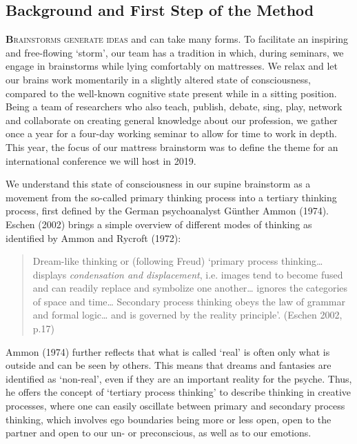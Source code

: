     \begin{adjmulticols}{2}{0mm}{0mm}
\chapter{Background and First Step of the Method}%
\lettrine[lines=2]{\bfseries\color{black}B}{rainstorms generate ideas} and can take many forms. To facilitate an inspiring and free-flowing ‘storm’, our team has a tradition in which, during seminars, we engage in brainstorms while lying comfortably on mattresses. We relax and let our brains work momentarily in a slightly altered state of consciousness, compared to the well-known cognitive state present while in a sitting position. Being a team of researchers who also teach, publish, debate, sing, play, network and collaborate on creating general knowledge about our profession, we gather once a year for a four-day working seminar to allow for time to work in depth. This year, the focus of our mattress brainstorm was to define the theme for an international conference we will host in 2019. 

We understand this state of consciousness in our supine brainstorm as a movement from the so-called primary thinking process into a tertiary thinking process, first defined by the German psychoanalyst Günther Ammon (1974).  Eschen (2002)  brings a simple overview of different modes of thinking as identified by Ammon and Rycroft (1972):%
    \blockquote{Dream-like thinking or (following Freud) ‘primary process thinking… displays  \textit{condensation and displacement}, i.e. images tend to become fused and can readily replace and symbolize one another… ignores the categories of space and time… Secondary process thinking obeys the law of grammar and formal logic… and is governed by the reality principle’. (Eschen 2002, p.17)}
Ammon (1974) further reflects that what is called `real’ is often only what is outside and can be seen by others. This means that dreams and fantasies are identified as `non-real’, even if they are an important reality for the psyche. Thus, he offers the concept of ‘tertiary process thinking’ to describe thinking in creative processes, where one can easily oscillate between primary and secondary process thinking, which involves ego boundaries being more or less open, open to the partner and open to our un- or preconscious, as well as to our emotions. 


\end{adjmulticols}
